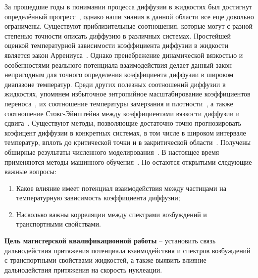 За прошедшие годы в понимании процесса диффузии в жидкостях был достигнут определённый прогресс~\cite{FrenkelBook,HansenBook,GrootBook,MarchBook}, однако наши знания в данной области все еще довольно ограничены.
Существуют приблизительные соотношения, которые могут с разной степенью точности описать диффузию в различных системах.
Простейшей оценкой температурной зависимости коэффициента диффузии в жидкости является закон Аррениуса~\cite{10.1126/science.278.5336.257}.
Однако пренебрежение динамической вязкостью и особенностями реального потенциала взаимодействия делает данный закон непригодным для точного определения коэффициента диффузии в широком диапазоне температур.
Среди других полезных соотношений диффузии в жидкостях, упомянем избыточное энтропийное масштабирование коэффициентов переноса~\cite{10.1103/physreva.15.2545, 10.1038/381137a0, 10.1063/1.5055064}, их соотношение температуры замерзания и плотности~\cite{10.1103/physreve.62.7524, 10.1063/1.5022058, 10.1063/1.5044703, 10.1103/physreve.103.042122}, а также соотношение Стокс-Эйнштейна между коэффициентами вязкости диффузии и сдвига~\cite{10.1063/1.446338, 10.1002/BBPC.19900940313, 10.1103/physreve.95.052122, 10.1063/1.5080662, 10.1080/00268976.2019.1643045}.
Существуют методы, позволяющие достаточно точно прогнозировать коэфицент диффузии в конкретных системах, в том числе в широком интервале температур, вплоть до критической точки и в закритической области~\cite{10.1063/1.1607953, 10.1016/j.camwa.2019.11.012, 10.1063/1.441097}.
Получены обширные результаты численного моделирования~\cite{10.1063/1.1786579, 10.1016/j.fluid.2011.03.002}.
В настоящее время применяются методы машинного обучения~\cite{10.1063/5.0011512}.
Но остаются открытыми следующие важные вопросы:
\begin{enumerate}
    \item Какое влияние имеет потенциал взаимодействия между частицами на температурную зависимость коэффициента диффузии;
    \item Насколько важны корреляции между спектрами возбуждений и транспортными свойствами.
\end{enumerate}

\newpage

\textbf{Цель магистерской квалификационной работы} -- установить связь \\ дальнодействия притяжения потенциала взаимодействия и спектров возбуждений с транспортными свойствами жидкостей, а также выявить влияние дальнодействия притяжения на скорость нуклеации.

